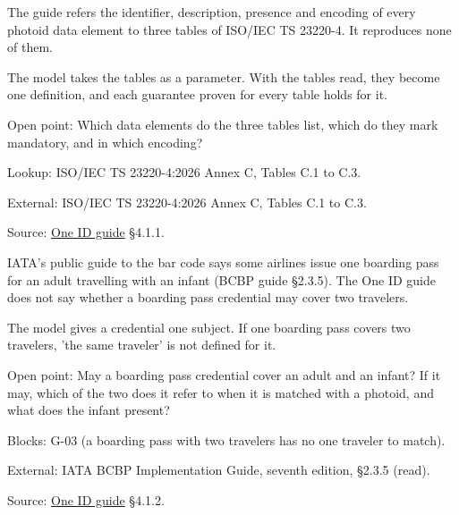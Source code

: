 \begin{definition}
  \label{def:c103}
  \notready
  The guide refers the identifier, description, presence and encoding of
  every photoid data element to three tables of ISO/IEC TS 23220-4. It
  reproduces none of them.

  The model takes the tables as a parameter. With the tables read, they
  become one definition, and each guarantee proven for every table holds for
  it.

  Open point: Which data elements do the three tables list, which do they
  mark mandatory, and in which encoding?

  Lookup: ISO/IEC TS 23220-4:2026 Annex C, Tables C.1 to C.3.

  External: ISO/IEC TS 23220-4:2026 Annex C, Tables C.1 to C.3.

  Source:
  \href{https://standards.atlassian.net/wiki/spaces/OneID/pages/2947416082/Technical+Implementation+Guide}{One
  ID guide} §4.1.1.
\end{definition}

\begin{definition}
  \label{def:c104}
  \notready
  IATA's public guide to the bar code says some airlines issue one boarding
  pass for an adult travelling with an infant (BCBP guide §2.3.5). The One ID
  guide does not say whether a boarding pass credential may cover two
  travelers.

  The model gives a credential one subject. If one boarding pass covers two
  travelers, 'the same traveler' is not defined for it.

  Open point: May a boarding pass credential cover an adult and an infant? If
  it may, which of the two does it refer to when it is matched with a photoid,
  and what does the infant present?

  Blocks: G-03 (a boarding pass with two travelers has no one traveler to
  match).

  External: IATA BCBP Implementation Guide, seventh edition, §2.3.5 (read).

  Source:
  \href{https://standards.atlassian.net/wiki/spaces/OneID/pages/2947416082/Technical+Implementation+Guide}{One
  ID guide} §4.1.2.
\end{definition}


